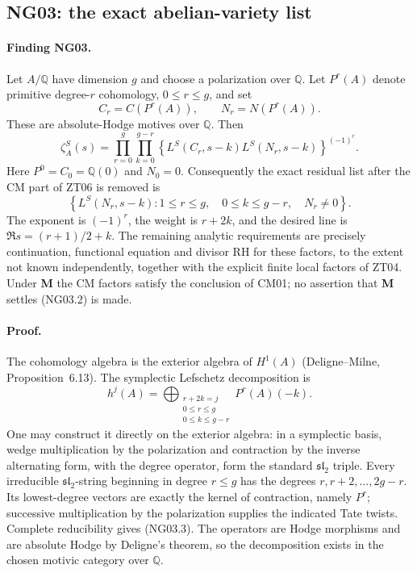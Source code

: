\documentclass[11pt]{article}
\theoremstyle{remark}
\begin{document}
\subsection{NG03: the exact abelian-variety list}
\label{NG03}

\paragraph{Finding NG03.}
Let $A/\mathbb Q$ have dimension $g$ and choose a polarization over
$\mathbb Q$.  Let $P^r(A)$ denote primitive degree-$r$ cohomology,
$0\le r\le g$, and set
\[
                  C_r=C(P^r(A)),\qquad N_r=N(P^r(A)).
\]
These are absolute-Hodge motives over $\mathbb Q$.  Then
\[
 \zeta_A^S(s)=
 \prod_{r=0}^g\prod_{k=0}^{g-r}
 \left\{L^S(C_r,s-k)L^S(N_r,s-k)\right\}^{(-1)^r}.            \tag{NG03.1}
\]
Here $P^0=C_0=\mathbb Q(0)$ and $N_0=0$.  Consequently the exact
residual list after the CM part of ZT06 is removed is
\[
 \boxed{\ \left\{L^S(N_r,s-k):1\le r\le g,\quad
                    0\le k\le g-r,\quad N_r\ne0\right\}.\ } \tag{NG03.2}
\]
The exponent is $(-1)^r$, the weight is $r+2k$, and the desired line is
$\Re s=(r+1)/2+k$.  The remaining analytic requirements are precisely
continuation, functional equation and divisor RH for these factors,
to the extent not known independently, together with the explicit
finite local factors of ZT04.  Under \textbf{M} the CM factors satisfy
the conclusion of CM01; no assertion that \textbf{M} settles
(NG03.2) is made.

\paragraph{Proof.}
The cohomology algebra is the exterior algebra of $H^1(A)$
(Deligne--Milne, Proposition~6.13).  The symplectic Lefschetz
decomposition is
\[
 h^j(A)=\bigoplus_{\substack{r+2k=j\\0\le r\le g\\0\le k\le g-r}}
                         P^r(A)(-k).                         \tag{NG03.3}
\]
One may construct it directly on the exterior algebra: in a symplectic
basis, wedge multiplication by the polarization and contraction by
the inverse alternating form, with the degree operator, form the
standard $\mathfrak{sl}_2$ triple.  Every irreducible
$\mathfrak{sl}_2$-string beginning in degree $r\le g$ has the degrees
$r,r+2,\ldots,2g-r$.  Its lowest-degree vectors are exactly the kernel
of contraction, namely $P^r$; successive multiplication by the
polarization supplies the indicated Tate twists.  Complete
reducibility gives (NG03.3).  The operators are Hodge morphisms and
are absolute Hodge by Deligne's theorem, so the decomposition exists
in the chosen motivic category over $\mathbb Q$.
\end{document}
